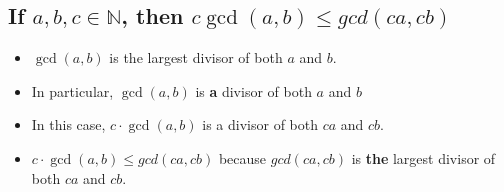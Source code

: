 \documentclass[11pt, oneside]{amsart}
\begin{document}
\subsection{If \(a, b, c \in \mathbb{N}\), then \(c \gcd(a,b) \leq gcd(ca, cb)\)}
\label{sec:orge5fdf78}
\begin{itemize}
\item \(\gcd(a,b)\) is the largest divisor of both \(a\) and \(b\).
\item In particular, \(\gcd(a,b)\) is \textbf{a} divisor of both \(a\) and \(b\)
\item In this case, \(c \cdot \gcd(a,b)\) is a divisor of both \(ca\) and \(cb\).
\item \(c \cdot \gcd(a,b) \leq gcd(ca, cb)\) because \(gcd(ca, cb)\) is \textbf{the} largest divisor of both \(ca\) and \(cb\).
\end{itemize}
\end{document}
